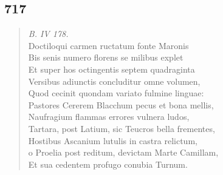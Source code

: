\documentclass[11pt, a4paper]{report}
\begin{document}
            \subsection*{717}
      \begin{verse}
      \textit{B. IV 178.} \\ Doctiloqui carmen ructatum fonte Maronis \\ Bis senis numero florens se milibus explet \\ Et super hos octingentis septem quadraginta \\ Versibus adiunctis concluditur omne volumen, \\ Quod cecinit quondam variato fulmine linguae: \\ Pastores Cererem Blacchum pecus et bona mellis, \\ Naufragium flammas errores vulnera ludos, \\ Tartara, post Latium, sic Teucros bella frementes, \\ Hostibus Ascanium lutulis in castra relictum, \\ o Proelia post reditum, devictam Marte Camillam, \\ Et sua cedentem profugo conubia Turnum. \\ 
      \end{verse}
  
\end{document}

